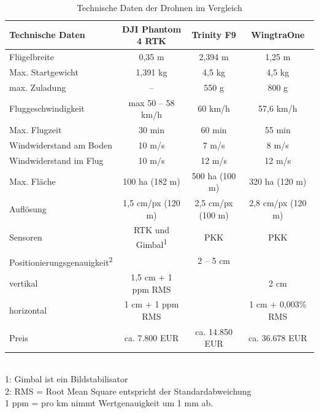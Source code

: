 \begin{table}[hbt]
\selectfont
\footnotesize
\begin{tabular}{lccc} %
\textbf{Technische Daten} & \textbf{DJI Phantom 4 RTK} & \textbf{Trinity F9}  & \textbf{WingtraOne} \\ %
\hline\hline
Flügelbreite & 0,35 m & 2,394 m & 1,25 m \\
Max. Startgewicht & 1,391 kg & 4,5 kg & 4,5 kg \\
max. Zuladung & – & 550 g & 800 g \\
Fluggeschwindigkeit & max 50 – 58 km/h & 60 km/h & 57,6 km/h \\
Max. Flugzeit & 30 min & 60 min & 55 min \\
Windwiderstand am Boden & 10 m/s & 7 m/s & 8 m/s \\
Windwiderstand im Flug & 10 m/s & 12 m/s & 12 m/s \\
Max. Fläche & 100 ha (182 m) & 500 ha (100 m) & 320 ha (120 m) \\
Auflösung & 1,5 cm/px (120 m) & 2,5 cm/px (100 m) & 2,8 cm/px (120 m) \\
Sensoren & RTK und Gimbal\textsuperscript{1} & PKK & PKK \\
Positionierungsgenauigkeit\textsuperscript{2} &  & 2 – 5 cm &  \\
{    } vertikal & 1,5 cm + 1 ppm RMS &  & 2 cm  \\
{    } horizontal & 1 cm + 1 ppm RMS &  & 1 cm + 0,003\% RMS\\
Preis & ca. 7.800 EUR & ca. 14.850 EUR & ca. 36.678 EUR\\
\hline
\end{tabular}
\\
\scriptsize
1: Gimbal ist ein Bildstabilisator \\
2: RMS = Root Mean Square entspricht der Standardabweichung \\
1 ppm = pro km nimmt Wertgenauigkeit um 1 mm ab. 
\caption{Technische Daten der Drohnen im Vergleich \citep[vgl.][]{DJI2019,QSGH2019,Wingtra2019}}
\label{tab:technischedaten}
\end{table}

